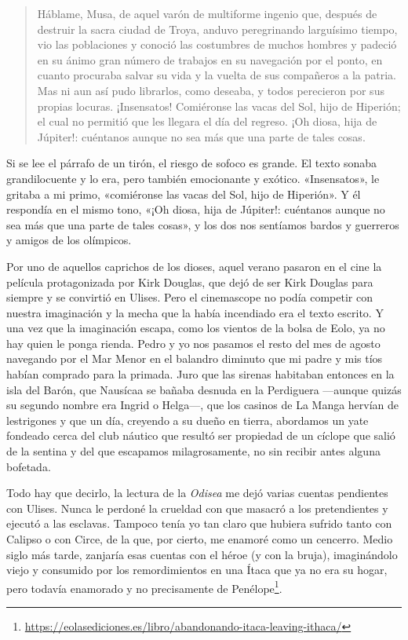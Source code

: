 \begin{quote}
\small
Háblame, Musa, de aquel varón de multiforme ingenio que, después de destruir la sacra ciudad de Troya, anduvo peregrinando larguísimo tiempo, vio las poblaciones y conoció las costumbres de muchos hombres y padeció en su ánimo gran número de trabajos en su navegación por el ponto, en cuanto procuraba salvar su vida y la vuelta de sus compañeros a la patria. Mas ni aun así pudo librarlos, como deseaba, y todos perecieron por sus propias locuras. ¡Insensatos! Comiéronse las vacas del Sol, hijo de Hiperión; el cual no permitió que les llegara el día del regreso. ¡Oh diosa, hija de Júpiter!: cuéntanos aunque no sea más que una parte de tales cosas.
\end{quote}

Si se lee el párrafo de un tirón, el riesgo de sofoco es grande. El texto sonaba grandilocuente y lo era, pero también emocionante y exótico. «Insensatos», le gritaba a mi primo, «comiéronse las vacas del Sol, hijo de Hiperión». Y él respondía en el mismo tono, «¡Oh diosa, hija de Júpiter!: cuéntanos aunque no sea más que una parte de tales cosas», y los dos nos sentíamos bardos y guerreros y amigos de los olímpicos.

Por uno de aquellos caprichos de los dioses, aquel verano pasaron en el cine la película protagonizada por Kirk Douglas, que dejó de ser Kirk Douglas para siempre y se convirtió en Ulises. Pero el cinemascope no podía competir con nuestra imaginación y la mecha que la había incendiado era el texto escrito. Y una vez que la imaginación escapa, como los vientos de la bolsa de Eolo, ya no hay quien le ponga rienda. Pedro y yo nos pasamos el resto del mes de agosto navegando por el Mar Menor en el balandro diminuto que mi padre y mis tíos habían comprado para la primada. Juro que las sirenas habitaban entonces en la isla del Barón, que Nausícaa se bañaba desnuda en la Perdiguera ---aunque quizás su segundo nombre era Ingrid o Helga---, que los casinos de La Manga hervían de lestrigones y que un día, creyendo a su dueño en tierra, abordamos un yate fondeado cerca del club náutico que resultó ser propiedad de un cíclope que salió de la sentina y del que escapamos milagrosamente, no sin recibir antes alguna bofetada.

Todo hay que decirlo, la lectura de la \emph{Odisea} me dejó varias cuentas pendientes con Ulises. Nunca le perdoné la crueldad con que masacró a los pretendientes y ejecutó a las esclavas. Tampoco tenía yo tan claro que hubiera sufrido tanto con Calipso o con Circe, de la que, por cierto, me enamoré como un cencerro. Medio siglo más tarde, zanjaría esas cuentas con el héroe (y con la bruja), imaginándolo viejo y consumido por los remordimientos en una Ítaca que ya no era su hogar, pero todavía enamorado y no precisamente de Penélope\footnote{\url{https://eolasediciones.es/libro/abandonando-itaca-leaving-ithaca/}}.

